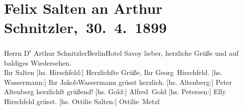 

         
         \renewcommand{\erwaehntePersonen}{Personen: Peter Altenberg, Alfred Gold, Georg Hirschfeld, Elly Petersen, Felix Salten, Ottilie Salten, Jakob Wassermann}
         \renewcommand{\erwaehnteOrte}{Orte: Berlin, Hotel Savoy, Wien}
         \renewcommand{\erwaehnteWerke}{}
               \section[ Felix Salten an Arthur Schnitzler, 30. 4. 1899]{ Felix Salten an Arthur Schnitzler, 30. 4. 1899}\nopagebreak{}\rehead{ }\begin{ledgroupsized}[t]{13cm}\normalsize\beginnumbering \toendnotes[C]{\smallbreak\pagebreak[2]} 
\pstart{}{\pb}Herrn D\textsuperscript{r} Arthur Schnitzler\pend{}\pstart{}Berlin\pend{}\pstart{}Hotel Savoy\pend{}{\bigskip}\pstart
           \noindent{}{\pb}lieber, herzliche Grüße und auf baldiges Wiedersehen.
               {\\}Ihr \spacefill\mbox{Salten}\pend
           \pstart
           {[}hs. Hirschfeld:{]} Herzlichſte Grüße, Ihr \spacefill\mbox{Georg
                  Hirschfeld.}\pend
           \pstart
           {[}hs. Wassermann:{]} Ihr JakobWassermann grüsst herzlich.\pend
           \pstart
           {[}hs. Altenberg:{]} Peter Altenberg herzlichſt grüßend!\pend
           \pstart
           {[}hs. Gold:{]} \spacefill\mbox{Alfred Gold}\pend
           \pstart
           {[}hs. Petersen:{]} Elly Hirschfeld grüsst.\pend
           \pstart
           {[}hs. Ottilie Salten:{]} \spacefill\mbox{Ottilie Metzl}\pend
           
         
         \endnumbering{}\end{ledgroupsized}  \newcommand{\dateiname}{L03289}\newcommand{\titel}{Felix Salten an Arthur Schnitzler, 30. 4. 1899}\newcommand{\editorInnen}{Martin Anton Müller und Laura Untner}
      